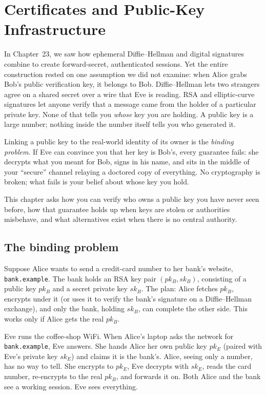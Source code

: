 \chapter{Certificates and Public-Key Infrastructure}

In Chapter~23, we saw how ephemeral Diffie--Hellman and digital signatures combine to
create forward-secret, authenticated sessions. Yet the entire construction rested on
one assumption we did not examine: when Alice grabs Bob's public verification
key, it belongs to Bob. Diffie--Hellman lets two strangers agree on a shared
secret over a wire that Eve is reading. RSA and elliptic-curve signatures let anyone
verify that a message came from the holder of a particular private key. None of
that tells you \emph{whose} key you are holding. A public key is a large number;
nothing inside the number itself tells you who generated it.

Linking a public key to the real-world identity of its owner is the \emph{binding problem}. If Eve can convince you that her key is Bob's, every guarantee fails: she decrypts what you meant for Bob, signs in his name, and sits in the middle of your ``secure'' channel relaying a doctored copy of everything. No cryptography is broken; what fails is your belief about whose key you hold.

This chapter asks how you can verify who owns a public key you have never seen before, how that guarantee holds up when keys are stolen or authorities misbehave, and what alternatives exist when there is no central authority.

\chapterline

\section{The binding problem}
\label{ch24:binding}

Suppose Alice wants to send a credit-card number to her bank's website, \texttt{bank.example}. The bank holds an RSA key pair $(pk_B, sk_B)$, consisting of a public key $pk_B$ and a secret private key $sk_B$. The plan: Alice fetches $pk_B$, encrypts under it (or uses it to verify the bank's signature on a Diffie--Hellman exchange), and only the bank, holding $sk_B$, can complete the other side. This works only if Alice gets the real $pk_B$.

Eve runs the coffee-shop WiFi. When Alice's laptop asks the network for \texttt{bank.example}, Eve answers. She hands Alice her own public key $pk_E$ (paired with Eve's private key $sk_E$) and claims it is the bank's. Alice, seeing only a number, has no way to tell. She encrypts to $pk_E$, Eve decrypts with $sk_E$, reads the card number, re-encrypts to the real $pk_B$, and forwards it on. Both Alice and the bank see a working session. Eve sees everything.

